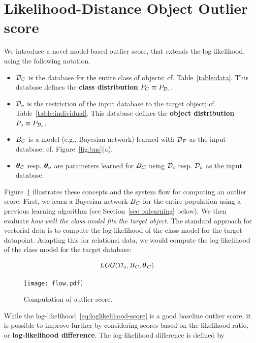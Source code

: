 \documentclass[conference]{IEEEtran}
\begin{document}
\section{Likelihood-Distance Object Outlier score} \label{sec:metrics}

We introduce a novel model-based outlier score, that extends the log-likelihood, using the following notation.
\begin{itemize}
\item $\mathcal{D}_{C}$ is the database for the entire class of objects; cf. Table~\ref{table:data}. This database defines the \textbf{class distribution} $P_{C} \equiv P_{\mathcal{D}_{c}}$.
\item $\mathcal{D}_{o}$ is the restriction of the input database to the target object; cf. Table~\ref{table:individual}. This database defines the \textbf{object distribution} $P_{o} \equiv P_{\mathcal{D}_{o}}$.
\item $B_{C}$ is a model (e.g., Bayesian network) learned with $\mathcal{D}_{\mathcal{P}}$ as the input database; cf. Figure~\ref{fig:bns}(a).
\item $\boldsymbol{\theta}_{C}$ resp. $\boldsymbol{\theta}_{o}$ are parameters learned for $B_{C}$ using $\mathcal{D}_{c}$ resp. $\mathcal{D}_{o}$ as the input database.
\end{itemize}

Figure~\ref{fig:flow} illustrates these concepts and the system flow for computing an outlier score. First, we learn a Bayesian network $B_{C}$ for the entire population using a previous learning algorithm (see Section~\ref{sec:bnlearning} below). We then evaluate {\em how well the class model fits the target object.} The standard approach for vectorial data is to compute the log-likelihood of the class model for the target datapoint. Adapting this for relational data, we would compute the log-likelihood of the class model for the target  database:

\begin{equation} \label{eq:loglikelihood-score}
\loglikelihood(\D_{\object},\model_{\Class},\parameters_{\Class}).
\end{equation}

\begin{figure}
\centering
\texttt{[image: flow.pdf]}
\caption{Computation of outlier score.
\label{fig:flow}}
\end{figure}



While the log-likelihood~\eqref{eq:loglikelihood-score} is a good baseline outlier score, it is possible to improve further by considering scores based on the likelihood ratio, or {\bf log-likelihood difference}. The log-likelihood difference is defined by
\end{document}
